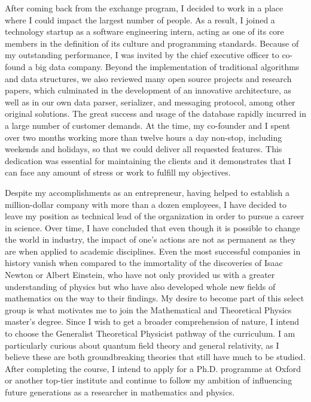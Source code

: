\documentclass[10pt]{article}
\begin{document}
After coming back from the exchange program, I decided to work in a place where I could impact the largest number of people. As a result, I joined a technology startup as a software engineering intern, acting as one of its core members in the definition of its culture and programming standards. Because of my outstanding performance, I was invited by the chief executive officer to co-found a big data company. Beyond the implementation of traditional algorithms and data structures, we also reviewed many open source projects and research papers, which culminated in the development of an innovative architecture, as well as in our own data parser, serializer, and messaging protocol, among other original solutions. The great success and usage of the database rapidly incurred in a large number of customer demands. At the time, my co-founder and I spent over two months working more than twelve hours a day non-stop, including weekends and holidays, so that we could deliver all requested features. This dedication was essential for maintaining the clients and it demonstrates that I can face any amount of stress or work to fulfill my objectives.

Despite my accomplishments as an entrepreneur, having helped to establish a million-dollar company with more than a dozen employees, I have decided to leave my position as technical lead of the organization in order to pursue a career in science. Over time, I have concluded that even though it is possible to change the world in industry, the impact of one's actions are not as permanent as they are when applied to academic disciplines. Even the most successful companies in history vanish when compared to the immortality of the discoveries of Isaac Newton or Albert Einstein, who have not only provided us with a greater understanding of physics but who have also developed whole new fields of mathematics on the way to their findings. My desire to become part of this select group is what motivates me to join the Mathematical and Theoretical Physics master's degree. Since I wish to get a broader comprehension of nature, I intend to choose the Generalist Theoretical Physicist pathway of the curriculum. I am particularly curious about quantum field theory and general relativity, as I believe these are both groundbreaking theories that still have much to be studied. After completing the course, I intend to apply for a Ph.D. programme at Oxford or another top-tier institute and continue to follow my ambition of influencing future generations as a researcher in mathematics and physics.
\end{document}
